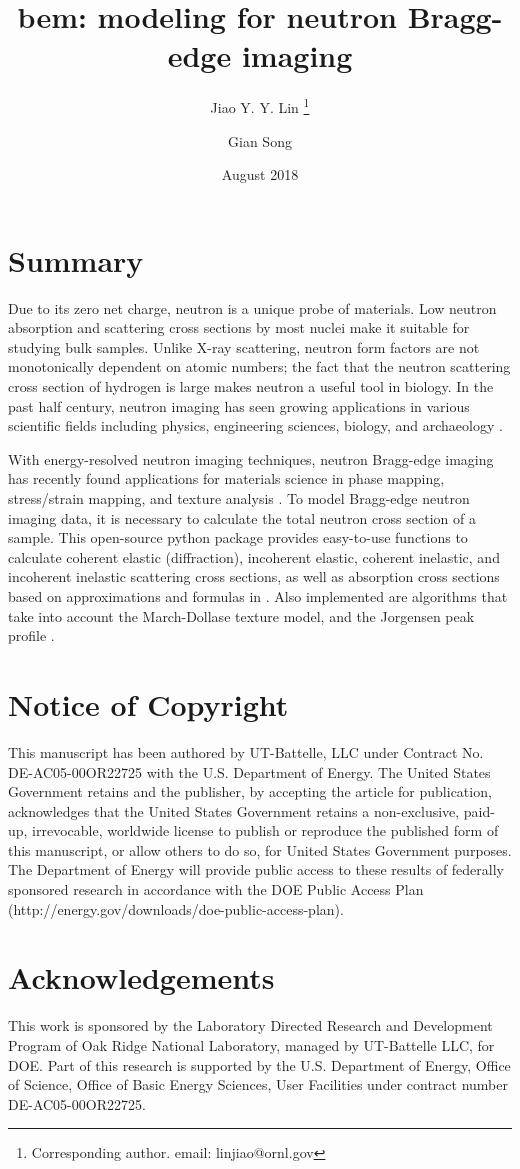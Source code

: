 \documentclass{article}
\title{bem: modeling for neutron Bragg-edge imaging}
\author[1]{Jiao Y. Y. Lin \thanks{Corresponding author. email: linjiao@ornl.gov}}
\author[1]{Gian Song}
\affil[1]{Neutron Scattering Division, Oak Ridge National Lab}
\date{August 2018}
\begin{document}
\maketitle

\section{Summary}\label{summary}
Due to its zero net charge, neutron is a unique probe of materials.
Low neutron absorption and scattering cross sections by most nuclei make it
suitable for studying bulk samples.
Unlike X-ray scattering, neutron form factors are not monotonically dependent on atomic numbers;
the fact that the neutron scattering cross section of hydrogen is large makes neutron
a useful tool in biology.
In the past half century, neutron imaging has seen growing applications
in various scientific fields
including physics, engineering sciences, biology, and archaeology
\cite{strobl2009}.

With energy-resolved neutron imaging techniques,
neutron Bragg-edge imaging has recently found applications for materials science in phase mapping,
stress/strain mapping, and texture analysis
\cite{lehmann2010, sato2017}.
To model Bragg-edge neutron imaging data, it is necessary to calculate
the total neutron cross section of a sample.
This open-source python package
provides easy-to-use functions to calculate coherent elastic (diffraction),
incoherent elastic, coherent inelastic, and incoherent inelastic scattering
cross sections, as well as absorption cross sections
based on approximations and formulas in \cite{vogel2000thesis}.
Also implemented are algorithms that take into account 
the March-Dollase texture model, and the Jorgensen peak profile
\cite{vogel2000thesis}.

\section{Notice of Copyright}\label{notice-of-copyright}
This manuscript has been authored by UT-Battelle, LLC under Contract No.
DE-AC05-00OR22725 with the U.S. Department of Energy. The United States
Government retains and the publisher, by accepting the article for
publication, acknowledges that the United States Government retains a
non-exclusive, paid-up, irrevocable, worldwide license to publish or
reproduce the published form of this manuscript, or allow others to do
so, for United States Government purposes. The Department of Energy will
provide public access to these results of federally sponsored research
in accordance with the DOE Public Access Plan
(http://energy.gov/downloads/doe-public-access-plan).

\section{Acknowledgements}\label{acknowledgements}
This work is sponsored by the Laboratory Directed Research and
Development Program of Oak Ridge National Laboratory, managed by
UT-Battelle LLC, for DOE. Part of this research is supported by the U.S.
Department of Energy, Office of Science, Office of Basic Energy
Sciences, User Facilities under contract number DE-AC05-00OR22725.



\end{document}
